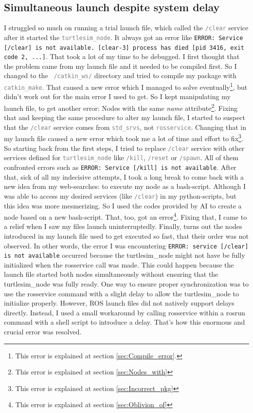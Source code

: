 \documentclass[conference]{IEEEtran}
\newcommand{\error}[1]{\textcolor{red!75!black}{\footnotesize \texttt{#1}}}
\newcommand{\command}[1]{\textcolor{gray}{\footnotesize \texttt{#1}}}
\begin{document}
\subsection{Simultaneous launch despite system delay}
\label{sec:Simultanous_launch}
I struggled so much on running a trial launch file, which called the \command{/clear} service after it started the \command{turtlesim\_node}. It always got an error like \error{ERROR: Service [/clear] is not available.
        [clear-3] process has died [pid 3416, exit code 2, ...]}. That took a lot of my time to be debugged. I first thought that the problem came from my launch file and it needed to be compiled first. So I changed to the \command{~/catkin\_ws/} directory and tried to compile my package with \command{catkin\_make}. That caused a new error which I managed to solve eventually\footnote{This error is explained at section \ref{sec:Compile_error}.}, but didn't work out for the main error I used to get. So I kept manipulating my launch file, to get another error: Nodes with the same \textit{name} attribute\footnote{This error is explained at section \ref{sec:Nodes_with}}. Fixing that and keeping the same procedure to alter my launch file, I started to suspect that the \command{/clear} service comes from \command{std\_srvs}, not \command{rosservice}. Changing that in my launch file caused a new error which took me a lot of time and effort to fix\footnote{This error is explained at section \ref{sec:Incorrect_pkg}}. So starting back from the first steps, I tried to replace \command{/clear} service with other services defined for \command{turtlesim\_node} like \command{/kill}, \command{/reset} or \command{/spawn}. All of them confronted errors such as \error{ERROR: Service [/kill] is not available}. After that, sick of all my indecisive attempts, I took a long break to come back with a new idea from my web-searches: to execute my node as a bash-script. Although I was able to access my desired services (like \command{/clear}) in my python-scripts, but this idea was more mesmerizing. So I used the codes provided by AI \cite{b2} to create a node based on a new bash-script. That, too, got an error\footnote{This error is explained at section \ref{sec:Oblivion_of}}. Fixing that, I came to a relief when I saw my files launch uninterruptedly. Finally, turns out the nodes introduced in my launch file used to get executed so fast, that their order was not observed. In other words, the error I was encountering \error{ERROR: service [/clear] is not available} occurred because the turtlesim\_node might not have be fully initialized when the rosservice call was made. This could happen because the launch file started both nodes simultaneously without ensuring that the turtlesim\_node was fully ready. One way to ensure proper synchronization was to use the rosservice command with a slight delay to allow the turtlesim\_node to initialize properly. However, ROS launch files did not natively support delays directly. Instead, I used a small workaround by calling rosservice within a rosrun command with a shell script to introduce a delay. That's how this enormous and crucial error was resolved.
\vspace{10px}
\end{document}
